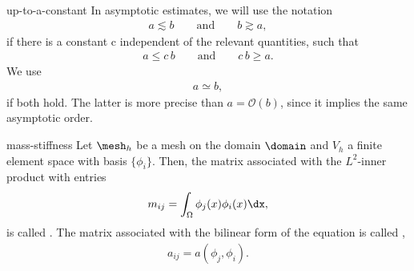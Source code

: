 \begin{Notation}{up-to-a-constant}
  In asymptotic estimates, we will use the notation
  \begin{gather*}
    a \lesssim b \qquad\text{and}\qquad b \gtrsim a,
  \end{gather*}
  if there is a constant c independent of the relevant quantities, such that
  \begin{gather*}
    a \le c \,b\qquad\text{and}\qquad c\,b \ge a.
  \end{gather*}
  We use
  \begin{gather*}
    a \simeq b,
  \end{gather*}
  if both hold. The latter is more precise than $a = \mathcal O(b)$,
  since it implies the same asymptotic order.
\end{Notation}


\begin{Definition}{mass-stiffness}
  Let $\mesh_h$ be a mesh on the domain $\domain$ and $V_h$ a finite
  element space with basis $\{\phi_i\}$. Then, the matrix associated
  with the $L^2$-inner product with entries
  \begin{gather*}
    m_{ij} = \int_\Omega \phi_j(x) \phi_i(x) \dx,
  \end{gather*}
  is called .
  The matrix associated with the
  bilinear form of the equation is called ,
  \begin{gather*}
    a_{ij} = a(\phi_j,\phi_i).
  \end{gather*}
\end{Definition}

